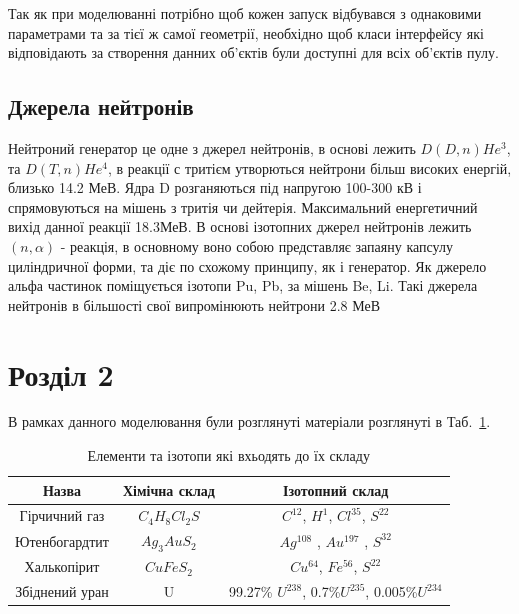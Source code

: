 \documentclass[a4paper, 14pt]{article}
\numberwithin{equation}{section}
\numberwithin{table}{section}
\begin{document}
Так як при моделюванні потрібно щоб кожен запуск відбувався з однаковими параметрами та за тієї ж самої геометрії, необхідно щоб класи інтерфейсу які відповідають за створення данних об'єктів були доступні для всіх об'єктів пулу.

\subsection{Джерела нейтронів}
	Нейтроний генератор це одне з джерел нейтронів, в основі лежить $D(D,n)He^3 $, та $D(T, n)He^4$, в реакції с тритієм утворються нейтрони більш високих енергій, близько 14.2 МеВ. Ядра D розганяються під напругою 100-300 кВ і спрямовуються на мішень з тритія чи дейтерія. Максимальний енергетичний вихід данної реакції 18.3МеВ. 
	В основі ізотопних джерел нейтронів лежить $(n,\alpha)$ - реакція, в основному воно собою представляє запаяну капсулу циліндричної форми, та діє по схожому принципу, як і генератор. Як джерело альфа частинок поміщується ізотопи Pu, Pb, за мішень Be, Li. Такі джерела нейтронів в більшості свої випромінюють нейтрони 2.8 МеВ

\newpage
\section{Розділ 2}
\setcounter{figure}{0}
В рамках данного моделювання були розглянуті матеріали розглянуті в Таб.~\ref{tabl:Materials}.
\begin{table}[h]
	\centering
	\begin{tabular}{|c|c|c|}
		\hline
		Назва & Хімічна склад & Ізотопний склад \\
		\hline
		Гірчичний газ & $C_4H_8Cl_2S$ & $C^{12}$, 	$H^1$, $Cl^{35}$, $S^{22}$ \\
		\hline
		Ютенбогардтит & $Ag_3AuS_2$ & $Ag^{108}$ , $Au^{197}$ , $S^{32}$ \\
		\hline
		Халькопірит & $CuFeS_2$ & $Cu^{64}$, $Fe^{56}$, $S^{22}$ \\
		\hline
		Збіднений уран & U & 99.27\% $U^{238}$, 0.7\%$U^{235}$, 0.005\%$U^{234}$\\
		\hline
	\end{tabular}
\caption{Елементи та ізотопи які вхьодять до їх складу} 
\label{tabl:Materials}
\end{table}
\end{document}
